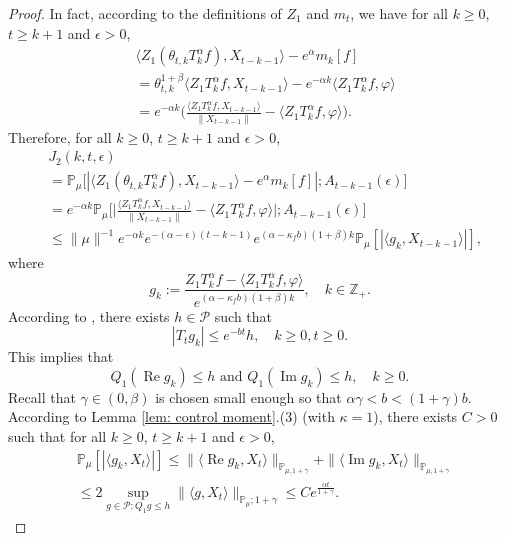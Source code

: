 \documentclass[12pt]{amsart}
\theoremstyle{plain}
\theoremstyle{definition}
\numberwithin{equation}{section}
\begin{document}
\begin{proof}
    In fact, according to the definitions of $Z_1$ and $m_t$, we have for all $k\geq 0$, $t\geq k+1$ and $\epsilon> 0$,
    \begin{align}
          &\langle Z_1(\theta_{t,k}T_k^{\alpha}f),X_{t-k-1}\rangle-e^{\alpha}m_k[f]
          \\&= \theta_{t,k}^{1+\beta} \langle Z_1T_k^{\alpha}f,X_{t-k-1}\rangle - e^{-\alpha k}\langle  Z_1T_k^{\alpha}f,\varphi\rangle
          \\&=e^{-\alpha k}\Big(\frac{\langle Z_1T_k^{\alpha}f ,X_{t-k-1}\rangle}{\|X_{t-k-1}\|}-\langle  Z_1T_k^{\alpha}f ,\varphi\rangle\Big).
    \end{align}
Therefore, for all $k\geq 0$, $t\geq k+1$ and $\epsilon> 0$,
\begin{align}
\label{eq: prevJ2}
&J_2(k,t,\epsilon)
	\\&= \mathbb P_\mu\big[|\langle Z_1(\theta_{t,k}T_k^{\alpha}f),X_{t-k-1}\rangle-e^{\alpha}m_k[f]|;A_{t-k-1}(\epsilon)\big]
    \\&=e^{-\alpha k}\mathbb{P}_{\mu}\bigg[\Big|\frac{\langle Z_1T^{\alpha}_k f,X_{t-k-1}\rangle}{\|X_{t-k-1}\|}-\langle  Z_1T^{\alpha}_k f,\varphi\rangle\Big|;A_{t-k-1}(\epsilon)\bigg]\nonumber\\
    &\leq \|\mu\|^{-1} e^{-\alpha k}e^{-(\alpha-\epsilon)(t-k-1)}e^{(\alpha-\kappa_f b)(1+\beta)k} \mathbb{P}_{\mu}\left[\left|\langle g_k,X_{t-k-1}\rangle\right|\right],
\end{align}
where
\[
g_k
	:= \frac{Z_1 T^{\alpha}_k f-\langle  Z_1T^{\alpha}_k f,\varphi\rangle}{e^{(\alpha-\kappa_f b)(1+\beta)k}},
	\quad k \in \mathbb Z_+.
\]
According to \cite[Lemma 2.8]{MM}, there exists $h \in \mathcal P$ such that
\[
     |T_t g_k|\leq e^{-bt}h,
     \quad k\geq 0,t\geq 0.
\]
 	This implies that
 \[
 	Q_1 (\operatorname{Re} g_k) \leq h
 	\text{ and } Q_1 (\operatorname{Im} g_k)\leq h,
 	\quad k \geq 0.
 \]
	Recall that $\gamma\in(0,\beta)$ is chosen small enough so that $\alpha \gamma < b < (1+\gamma)b$.
	According to Lemma \ref{lem: control moment}.(3) (with $\kappa=1$), there exists $C>0$ such that for all $k\geq 0$, $t\geq k+1$ and $\epsilon> 0$,
\begin{align}
    &\mathbb{P}_{\mu}\left[\left|\langle g_k,X_{t}\rangle\right|\right]
    \leq \|\langle \operatorname{Re} g_k, X_{t}\rangle\|_{\mathbb{P}_{\mu,1+\gamma}} + \|\langle \operatorname{Im} g_k, X_{t}\rangle\|_{\mathbb{P}_{\mu,1+\gamma}}
    \\& \leq 2\sup_{g\in \mathcal P: Q_1 g\leq h} \|\langle g, X_t\rangle\|_{\mathbb P_\mu; 1+\gamma} \leq C e^{\frac{\alpha t}{1+\gamma}}.

\end{align}
\end{proof}
\end{document}
